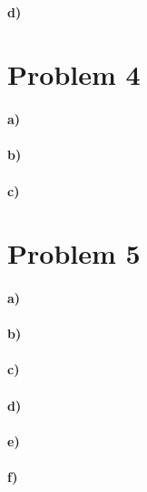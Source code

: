 \documentclass[12pt]{article}
\begin{document}
\paragraph{d)}

\section*{Problem 4}

\paragraph{a)}

\paragraph{b)}

\paragraph{c)}

\section*{Problem 5}

\paragraph{a)}

\paragraph{b)}

\paragraph{c)}

\paragraph{d)}

\paragraph{e)}

\paragraph{f)}
\end{document}
